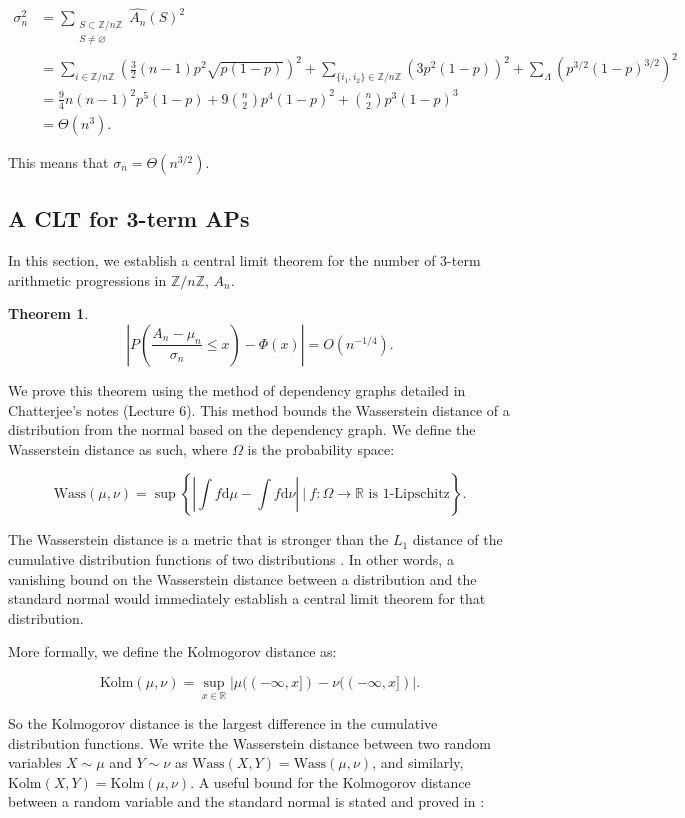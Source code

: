 \documentclass[12pt]{article} %
\newcommand{\p}[1]{\left(#1\right)}
\newcommand{\abs}[1]{\left\lvert#1\right\rvert}
\newcommand{\R}{\mathbb{R}}
\newcommand{\Wass}{\mathrm{Wass}}
\newcommand{\Kolm}{\mathrm{Kolm}}
\newcommand{\Z}{\mathbb{Z}}
\renewcommand{\d}{\mathrm{d}}
\newtheorem{thm}{Theorem}[section]
\theoremstyle{definition}
\theoremstyle{definition}
\begin{document}
\begin{align*}
\sigma_n^2 &= \sum_{\substack{S \subset \Z / n\Z \\ S \neq \varnothing}} {\hat{A_n}(S)^2} \\
&= \sum_{i \in \Z / n\Z} {\p{\frac{3}{2}(n-1)p^2\sqrt{p(1-p)}}^2} + \sum_{\{i_1, i_2\} \in \Z / n\Z} {\p{3p^2(1-p)}^2} + \sum_{\Lambda} {\p{p^{3/2}(1-p)^{3/2}}^2} \\
&= \frac{9}{4}n(n-1)^2p^5(1-p) + 9\binom{n}{2}p^4(1-p)^2 + \binom{n}{2}p^3(1-p)^3 \\
&= \Theta(n^3).
\end{align*}

This means that $\sigma_n = \Theta(n^{3/2})$.

\subsection{A CLT for 3-term APs}

In this section, we establish a central limit theorem for the number of 3-term arithmetic progressions in $\Z / n\Z$, $A_n$.

\begin{thm}
\label{thm:clt-an}
$$\abs{P\p{\frac{A_n - \mu_n}{\sigma_n} \leq x} - \Phi(x)} = O\p{n^{-1/4}}.$$
\end{thm}

We prove this theorem using the method of dependency graphs detailed in Chatterjee's notes \cite{Chatterjee07} (Lecture 6). This method bounds the Wasserstein distance of a distribution from the normal based on the dependency graph. We define the Wasserstein distance as such, where $\Omega$ is the probability space:

$$ \Wass(\mu, \nu) = \sup\left\{{\abs{\int{f \d \mu} - \int{f \d \nu}}\ \big|\ f : \Omega \to \R \text{ is 1-Lipschitz}}\right\}.$$

The Wasserstein distance is a metric that is stronger than the $L_1$ distance of the cumulative distribution functions of two distributions \cite{Chatterjee07}. In other words, a vanishing bound on the Wasserstein distance between a distribution and the standard normal would immediately establish a central limit theorem for that distribution.

More formally, we define the Kolmogorov distance as:

$$ \Kolm(\mu, \nu) = \sup_{x \in \R}{\abs{\mu((-\infty, x]) - \nu((-\infty, x])}}. $$

So the Kolmogorov distance is the largest difference in the cumulative distribution functions. We write the Wasserstein distance between two random variables $X \sim \mu$ and $Y \sim \nu$ as $\Wass(X, Y) = \Wass(\mu, \nu)$, and similarly, $\Kolm(X, Y) = \Kolm(\mu, \nu)$. A useful bound for the Kolmogorov distance between a random variable and the standard normal is stated and proved in \cite{Chatterjee07}:
\end{document}
